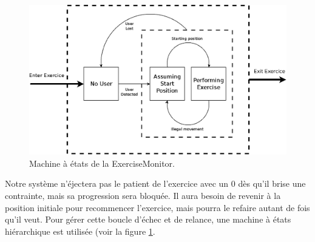 \begin{figure}[h!]
\centering
\includegraphics[width=0.9\linewidth]{images/exercise_monitor}
\caption{Machine à états de la ExerciseMonitor.}
\label{fig:exercise_monitor}
\end{figure}

Notre système n'éjectera pas le patient de l'exercice avec un 0 dès qu'il brise 
une contrainte, mais sa progression sera bloquée. Il aura besoin de revenir à la
position initiale pour recommencer l'exercice, mais pourra le refaire autant de fois
qu'il veut. Pour gérer cette boucle d'échec et de relance, une machine à états
hiérarchique est utilisée (voir la figure \ref{fig:exercise_monitor}.
    